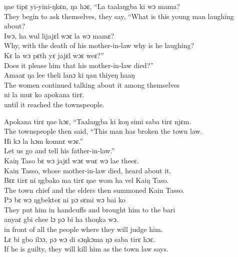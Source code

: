 ŋae tipɛ yi-yini-ŋkɛn, ŋa hɔɛ, “La taalaŋgba ki wɔ mama?\\
They begin to ask themselves, they say, “What is this young man laughing about?\\

Iwɔ, ha wul lijajɛl wɔɛ la wɔ mamɛ?\\
Why, with the death of his mother-in-law why is he laughing?\\

Kɛ la wɔ pɛth yɛ jajɛl wɔɛ weɛ?”\\
Does it please him that his mother-in-law died?”\\

Amaaɛ ŋa lee theli lanɔ ki ŋan thiyeŋ haaŋ\\ 
The women continued talking about it among themselves\\ 

ni la muɛ ko apokana tirɛ.\\
until it reached the townspeople.\newpage

Apokana tirɛ ŋae hɔɛ, “Taalaŋgba ki koŋ simi saba tirɛ njɛm.\\
The townspeople then said, “This man has broken the town law.\\

Hi kɔ la hɔm komnɛ wɔɛ.”\\
Let us go and tell his father-in-law.”\\

Kaiŋ Taso bɛ wɔ jajɛl wɔɛ wuɛ wɔ lae theeɛ.\\
Kain Tasso, whose mother-in-law died, heard about it.\\

Bɛɛ tirɛ ni ŋgbako ma tirɛ ŋae wom ha vel Kaiŋ Taso.\\
The town chief and the elders then summoned Kain Tasso.\\

Pɔ bɛ wɔ ŋgbekteɛ ni pɔ sɛmi wɔ bai ko\\ 
They put him in handcuffs and brought him to the bari\\ 

anyaɛ gbi chee lɔ pɔ bi ha thoŋka wɔ.\\
in front of all the people where they will judge him.\\

Lɛ bi gbo ilɔɔ, pɔ wɔ di sɔŋkɔma ŋɔ saba tirɛ hɔɛ.\\
If he is guilty, they will kill him as the town law says.\\

